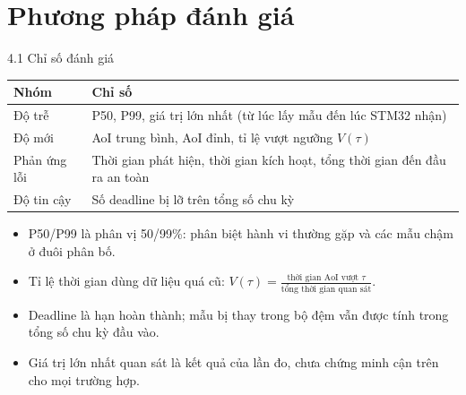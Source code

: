 \documentclass[aspectratio=169,12pt,t]{beamer}
\renewcommand{\arraystretch}{1.02}
\begin{document}
\section{Phương pháp đánh giá}
\begin{frame}{4.1 Chỉ số đánh giá}
\relax
\normalsize

\renewcommand{\arraystretch}{1.35}
\begin{tabular}{@{}L{.22\textwidth}@{\hspace{.06\textwidth}}L{.66\textwidth}@{}}
\toprule
\textbf{Nhóm} & \textbf{Chỉ số}\\\midrule
Độ trễ & P50, P99, giá trị lớn nhất (từ lúc lấy mẫu đến lúc STM32 nhận)\\
Độ mới & AoI trung bình, AoI đỉnh, tỉ lệ vượt ngưỡng $V(\tau)$\\
Phản ứng lỗi & Thời gian phát hiện, thời gian kích hoạt, tổng thời gian đến đầu ra an toàn\\
Độ tin cậy & Số deadline bị lỡ trên tổng số chu kỳ\\
\bottomrule
\end{tabular}\par

\vspace{.8em}
\begin{itemize}
\item P50/P99 là phân vị 50/99\%: phân biệt hành vi thường gặp và các mẫu chậm ở đuôi phân bố.
\item Tỉ lệ thời gian dùng dữ liệu quá cũ: $V(\tau)=\frac{\text{thời gian AoI vượt }\tau}{\text{tổng thời gian quan sát}}$.
\item Deadline là hạn hoàn thành; mẫu bị thay trong bộ đệm vẫn được tính trong tổng số chu kỳ đầu vào.
\item Giá trị lớn nhất quan sát là kết quả của lần đo, chưa chứng minh cận trên cho mọi trường hợp.
\end{itemize}
\end{frame}
\end{document}
